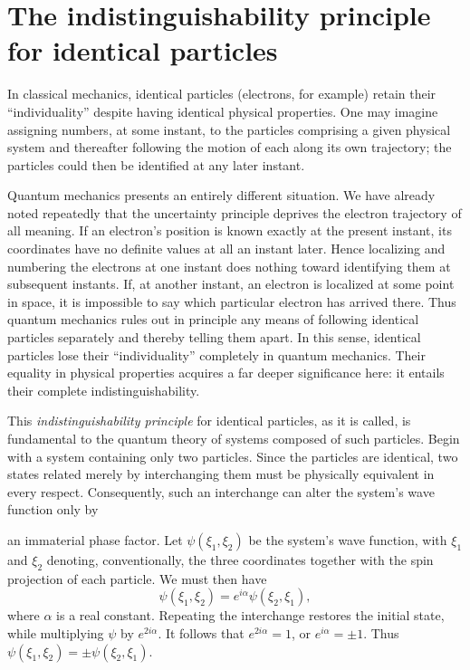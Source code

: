 \section{The indistinguishability principle for identical particles}

In classical mechanics, identical particles (electrons, for example) retain their ``individuality'' despite having identical physical properties. One may imagine assigning numbers, at some instant, to the particles comprising a given physical system and thereafter following the motion of each along its own trajectory; the particles could then be identified at any later instant.

Quantum mechanics presents an entirely different situation. We have already noted repeatedly that the uncertainty principle deprives the electron trajectory of all meaning. If an electron's position is known exactly at the present instant, its coordinates have no definite values at all an instant later. Hence localizing and numbering the electrons at one instant does nothing toward identifying them at subsequent instants. If, at another instant, an electron is localized at some point in space, it is impossible to say which particular electron has arrived there. Thus quantum mechanics rules out in principle any means of following identical particles separately and thereby telling them apart. In this sense, identical particles lose their ``individuality'' completely in quantum mechanics. Their equality in physical properties acquires a far deeper significance here: it entails their complete indistinguishability.

This \emph{indistinguishability principle} for identical particles, as it is called, is fundamental to the quantum theory of systems composed of such particles. Begin with a system containing only two particles. Since the particles are identical, two states related merely by interchanging them must be physically equivalent in every respect. Consequently, such an interchange can alter the system's wave function only by

an immaterial phase factor. Let $\psi(\xi_1,\xi_2)$ be the system's wave function, with $\xi_1$ and $\xi_2$ denoting, conventionally, the three coordinates together with the spin projection of each particle. We must then have
\[
  \psi(\xi_1,\xi_2)=e^{i\alpha}\psi(\xi_2,\xi_1),
\]
where $\alpha$ is a real constant. Repeating the interchange restores the initial state, while multiplying $\psi$ by $e^{2i\alpha}$. It follows that $e^{2i\alpha}=1$, or $e^{i\alpha}=\pm1$. Thus $\psi(\xi_1,\xi_2)=\pm\psi(\xi_2,\xi_1)$.

